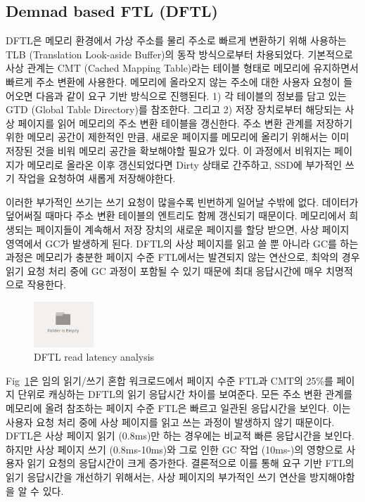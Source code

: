 \documentclass[conference]{IEEEtran}
\begin{document}
\subsection{Demnad based FTL (DFTL)}

DFTL은 메모리 환경에서 가상 주소를 물리 주소로 빠르게 변환하기 위해 사용하는
TLB (Translation Look-aside Buffer)의 동작 방식으로부터 차용되었다. 기본적으로 사상 관계는
CMT (Cached Mapping Table)라는 테이블 형태로 메모리에 유지하면서 빠르게 주소 변환에 사용한다.
메모리에 올라오지 않는 주소에 대한 사용자 요청이 들어오면 다음과 같이 요구 기반 방식으로 진행된다.
1) 각 테이블의 정보를 담고 있는 GTD (Global Table Directory)를 참조한다. 그리고 2) 저장 장치로부터
해당되는 사상 페이지를 읽어 메모리의 주소 변환 테이블을 갱신한다. 주소 변환 관계를 저장하기 위한
메모리 공간이 제한적인 만큼, 새로운 페이지를 메모리에 올리기 위해서는 이미 저장된 것을 비워
메모리 공간을 확보해야할 필요가 있다. 이 과정에서 비워지는 페이지가 메모리로 올라온 이후 갱신되었다면
Dirty 상태로 간주하고, SSD에 부가적인 쓰기 작업을 요청하여 새롭게 저장해야한다. \par

이러한 부가적인 쓰기는 쓰기 요청이 많을수록 빈번하게 일어날 수밖에 없다. 데이터가 덮어써질 때마다
주소 변환 테이블의 엔트리도 함께 갱신되기 때문이다. 메모리에서 희생되는 페이지들이 계속해서
저장 장치의 새로운 페이지를 할당 받으면, 사상 페이지 영역에서 GC가 발생하게 된다.
DFTL의 사상 페이지를 읽고 쓸 뿐 아니라 GC를 하는 과정은 메모리가 충분한 페이지 수준 FTL에서는
발견되지 않는 연산으로, 최악의 경우 읽기 요청 처리 중에 GC 과정이 포함될 수 있기 때문에
최대 응답시간에 매우 치명적으로 작용한다. \par

\begin{figure}[h]
	\centering
	\includegraphics[width=0.2\textwidth]{image/bg.png}
	\caption{DFTL read latency analysis}
	\label{fig:DFTL_cdf}
\end{figure}

Fig~\ref{fig:DFTL_cdf}은 임의 읽기/쓰기 혼합 워크로드에서 페이지 수준 FTL과 CMT의 25\%를
페이지 단위로 캐싱하는 DFTL의 읽기 응답시간 차이를 보여준다. 모든 주소 변환 관계를 메모리에 올려
참조하는 페이지 수준 FTL은 빠르고 일관된 응답시간을 보인다. 이는 사용자 요청 처리 중에
사상 페이지를 읽고 쓰는 과정이 발생하지 않기 때문이다. DFTL은 사상 페이지 읽기 (0.8ms)만
하는 경우에는 비교적 빠른 응답시간을 보인다. 하지만 사상 페이지 쓰기 (0.8ms-10ms)와 그로 인한
GC 작업 (10ms-)의 영향으로 사용자 읽기 요청의 응답시간이 크게 증가한다. 결론적으로 이를 통해
요구 기반 FTL의 읽기 응답시간을 개선하기 위해서는, 사상 페이지의 부가적인 쓰기 연산을
방지해야함을 알 수 있다. \par
\end{document}
